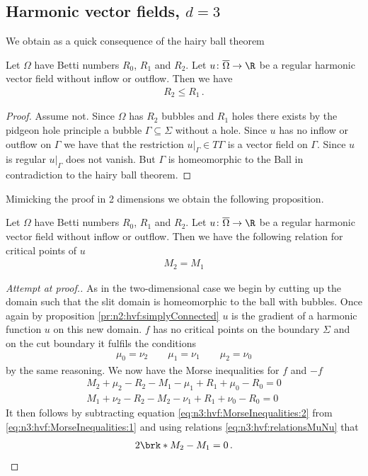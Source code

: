 \subsection{Harmonic vector fields, $d=3$}
We obtain as a quick consequence of the hairy ball theorem
\begin{proposition}
  Let $\Omega$ have Betti numbers $R_0$, $R_1$ and $R_2$.
  Let $u\colon\overline{\Omega}\to\R$
  be a regular harmonic vector field without inflow or outflow. Then we have
  \begin{align*}
    R_2\leq R_1\,.
  \end{align*}
\end{proposition}
\begin{proof}
  Assume not. Since $\Omega$ has $R_2$ bubbles and $R_1$ holes there exists by the pidgeon hole
  principle a bubble $\Gamma\subseteq\Sigma$ without a hole. Since $u$ has no inflow or outflow on $\Gamma$ we
  have that the restriction $u\vert_\Gamma\in T\Gamma$ is a vector field on $\Gamma$. Since $u$ is regular
  $u\vert_\Gamma$ does not vanish. But $\Gamma$ is homeomorphic to the Ball in contradiction to the hairy ball theorem.
\end{proof}
Mimicking the proof in 2 dimensions we obtain the following proposition.
\begin{proposition}
  Let $\Omega$ have Betti numbers $R_0$, $R_1$ and $R_2$.
  Let $u\colon\overline{\Omega}\to\R$ be a regular harmonic vector field without inflow or outflow. Then we have the following relation for
  critical points of $u$
  \begin{align*}
    M_2=M_1
  \end{align*}
\end{proposition}
\begin{proof}[Attempt at proof.]
  As in the two-dimensional case we begin by cutting up the domain such that the slit domain is homeomorphic to the ball with bubbles.
  Once again by proposition \ref{pr:n2:hvf:simplyConnected} $u$ is the gradient of a harmonic function $u$ on this new domain.
  $f$ has no critical points on the boundary $\Sigma$ and on the cut boundary it fulfils the conditions
  \begin{align}
    \mu_0=\nu_2\qquad \mu_1=\nu_1 \qquad \mu_2=\nu_0 \label{eq:n3:hvf:relationsMuNu}
  \end{align}
  by the same reasoning. We now have the Morse inequalities for $f$ and $-f$
  \begin{align}
    M_2+\mu_2-R_2-M_1-\mu_1+R_1+\mu_0-R_0=0 \label{eq:n3:hvf:MorseInequalities:1} \\
    M_1+\nu_2-R_2-M_2-\nu_1+R_1+\nu_0-R_0=0 \label{eq:n3:hvf:MorseInequalities:2}
  \end{align}
  It then follows by subtracting equation \eqref{eq:n3:hvf:MorseInequalities:2} from \eqref{eq:n3:hvf:MorseInequalities:1}
  and using relations \eqref{eq:n3:hvf:relationsMuNu} that
  \begin{align*}
    2\brk*{M_2-M_1}=0\,.
  \end{align*}
\end{proof}


